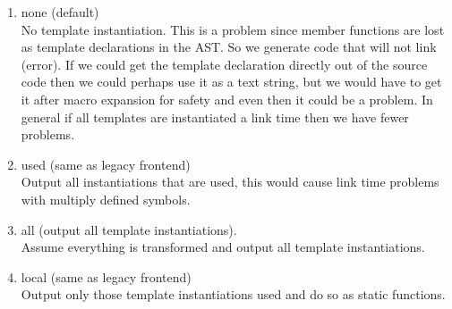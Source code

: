 {\begin{enumerate}
   \item none (default) \\
         No template instantiation. This is a problem since member functions are lost as
         template declarations in the AST.  So we generate code that will not link
         (error).  If we could get the template declaration directly out of the source
         code then we could perhaps use it as a text string, but we would have to get it
         after macro expansion for safety and even then it could be a problem. In general
         if all templates are instantiated a link time then we have fewer problems.
   \item used (same as legacy frontend) \\
         Output all instantiations that are used, this would cause link time problems with
         multiply defined symbols.
   \item all (output all template instantiations). \\
         Assume everything is transformed and output all template instantiations.
   \item local (same as legacy frontend) \\
         Output only those template instantiations used and do so as static functions.         
\end{enumerate}
}


